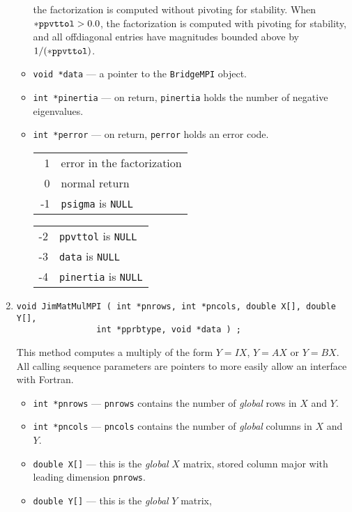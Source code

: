 \begin{enumerate}
\begin{itemize}
      the factorization is computed without pivoting for stability.
      When ${\tt *ppvttol} > 0.0$, the factorization is computed 
      with pivoting for stability, and all offdiagonal entries 
      have magnitudes bounded above by $1/({\tt *ppvttol})$.
\item {\tt void *data} --- a pointer to the {\tt BridgeMPI} object.
\item {\tt int *pinertia} --- on return, {\tt *pinertia} holds the 
      number of negative eigenvalues.
\item {\tt int *perror} --- on return, {\tt *perror} holds an
      error code.
      \begin{center}
      \begin{tabular}[t]{rl}
      ~1 & error in the factorization \\
      ~0 & normal return \\
      -1 & \texttt{psigma} is \texttt{NULL}
      \end{tabular}
      \begin{tabular}[t]{rl}
      -2 & \texttt{ppvttol} is \texttt{NULL} \\
      -3 & \texttt{data} is \texttt{NULL} \\
      -4 & \texttt{pinertia} is \texttt{NULL}
      \end{tabular}
      \end{center}
\end{itemize}
\item
\begin{verbatim}
void JimMatMulMPI ( int *pnrows, int *pncols, double X[], double Y[],
                int *pprbtype, void *data ) ;
\end{verbatim}
This method computes a multiply of the form $Y = I X$, $Y = A X$
or $Y = B X$.
All calling sequence parameters are pointers to more
easily allow an interface with Fortran.
\begin{itemize}
\item {\tt int *pnrows} --- {\tt *pnrows} contains the number of
      {\it global} rows in $X$ and $Y$.
\item {\tt int *pncols} --- {\tt *pncols} contains the number of
      {\it global} columns in $X$ and $Y$.
\item {\tt double X[]} --- this is the {\it global} $X$ matrix, 
      stored column major with leading dimension {\tt *pnrows}.
\item {\tt double Y[]} --- this is the {\it global} $Y$ matrix, 

\end{itemize}
\end{enumerate}
